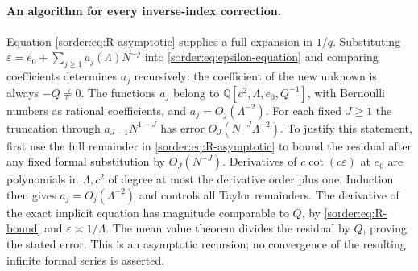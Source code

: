 \paragraph{An algorithm for every inverse-index correction.}
Equation \eqref{sorder:eq:R-asymptotic} supplies a full expansion in
$1/q$. Substituting
$\varepsilon=e_0+\sum_{j\ge1}a_j(\Lambda)N^{-j}$ into
\eqref{sorder:eq:epsilon-equation} and comparing coefficients determines
$a_j$ recursively: the coefficient of the new unknown is always
$-Q\ne0$. The functions $a_j$ belong to
$\mathbb Q[c^2,\Lambda,e_0,Q^{-1}]$, with Bernoulli numbers as rational
coefficients, and $a_j=O_j(\Lambda^{-2})$.
For each fixed $J\ge1$ the truncation through $a_{J-1}N^{1-J}$ has
error $O_J(N^{-J}\Lambda^{-2})$. To justify this statement, first use
the full remainder in \eqref{sorder:eq:R-asymptotic} to bound the
residual after any fixed formal substitution by $O_J(N^{-J})$.
Derivatives of $c\cot(c\varepsilon)$ at $e_0$ are polynomials in
$\Lambda,c^2$ of degree at most the derivative order plus one.
Induction then gives $a_j=O_j(\Lambda^{-2})$ and controls all Taylor
remainders. The derivative of the exact implicit equation has magnitude
comparable to $Q$, by \eqref{sorder:eq:R-bound} and
$\varepsilon\asymp1/\Lambda$. The mean value theorem divides the
residual by $Q$, proving the stated error. This is an asymptotic
recursion; no convergence of the resulting infinite formal series is asserted.

